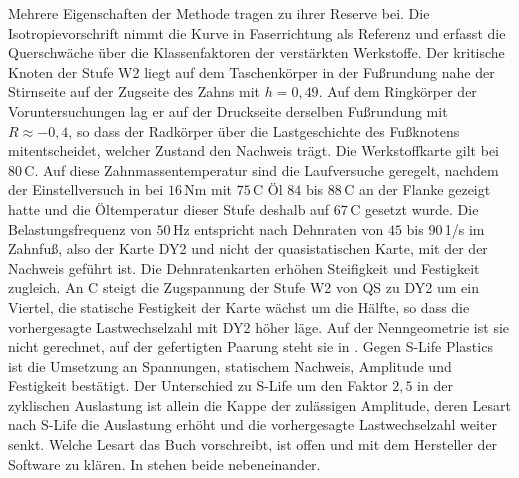 Mehrere Eigenschaften der Methode tragen zu ihrer Reserve bei. Die Isotropievorschrift nimmt die Kurve in Faserrichtung als Referenz und erfasst die Querschwäche über die Klassenfaktoren der verstärkten Werkstoffe. Der kritische Knoten der Stufe W2 liegt auf dem Taschenkörper in der Fußrundung nahe der Stirnseite auf der Zugseite des Zahns mit $h = 0{,}49$. Auf dem Ringkörper der Voruntersuchungen lag er auf der Druckseite derselben Fußrundung mit $R \approx -0{,}4$, so dass der Radkörper über die Lastgeschichte des Fußknotens mitentscheidet, welcher Zustand den Nachweis trägt. Die Werkstoffkarte gilt bei $80$\,\textdegree C. Auf diese Zahnmassentemperatur sind die Laufversuche geregelt, nachdem der Einstellversuch in  bei $16$\,Nm mit $75$\,\textdegree C Öl $84$ bis $88$\,\textdegree C an der Flanke gezeigt hatte und die Öltemperatur dieser Stufe deshalb auf $67$\,\textdegree C gesetzt wurde. Die Belastungsfrequenz von $50$\,Hz entspricht nach  Dehnraten von $45$ bis $90$\,1/s im Zahnfuß, also der Karte DY2 und nicht der quasistatischen Karte, mit der der Nachweis geführt ist. Die Dehnratenkarten erhöhen Steifigkeit und Festigkeit zugleich. An C steigt die Zugspannung der Stufe W2 von QS zu DY2 um ein Viertel, die statische Festigkeit der Karte wächst um die Hälfte, so dass die vorhergesagte Lastwechselzahl mit DY2 höher läge. Auf der Nenngeometrie ist sie nicht gerechnet, auf der gefertigten Paarung steht sie in . Gegen S-Life Plastics ist die Umsetzung an Spannungen, statischem Nachweis, Amplitude und Festigkeit bestätigt. Der Unterschied zu S-Life um den Faktor $2{,}5$ in der zyklischen Auslastung ist allein die Kappe der zulässigen Amplitude, deren Lesart nach S-Life die Auslastung erhöht und die vorhergesagte Lastwechselzahl weiter senkt. Welche Lesart das Buch vorschreibt, ist offen und mit dem Hersteller der Software zu klären. In  stehen beide nebeneinander.



